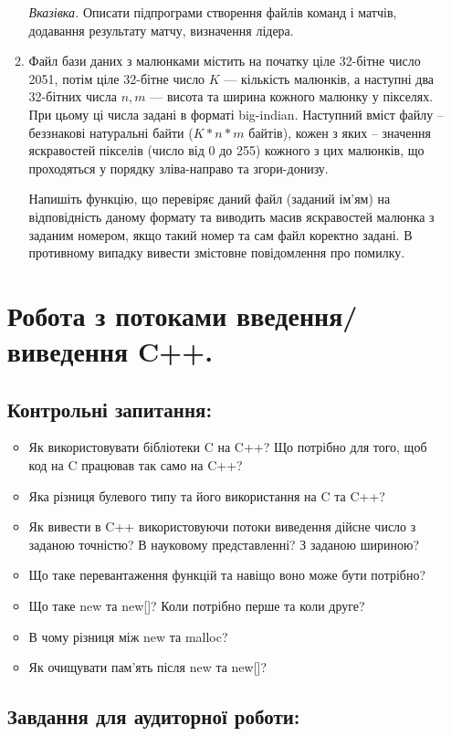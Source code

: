 \documentclass[a5paper,titlepage,openany,twoside,
]
{book_unv}%
\begin{document}
\begin{enumerate}
\begin{enumerate}
\emph{Вказівка.} Описати підпрограми створення файлів команд і матчів, 
додавання результату матчу, визначення лідера.

\item
Файл бази даних з малюнками містить на початку ціле 32-бітне число
2051, потім ціле 32-бітне число $K$ --- кількість малюнків, а наступні два
32-бітних числа $n,m$ --- висота та ширина кожного малюнку у
пікселях. При цьому ці числа задані в форматі big-indian.
Наступний вміст файлу -- беззнакові натуральні байти ($K*n*m$ байтів),
кожен з яких -- значення яскравостей пікселів (число від 0 до 255)
кожного з цих малюнків, що проходяться у порядку зліва-направо та
згори-донизу.

Напишіть функцію, що перевіряє даний файл (заданий ім'ям) на
відповідність даному формату та виводить масив яскравостей малюнка з
заданим номером, якщо такий номер та сам файл коректно задані. В
противному випадку вивести змістовне повідомлення про помилку.

\end{enumerate}


\chapter{Робота з потоками введення/виведення C++.}
%

\section{Контрольні запитання:}
\begin{itemize}

\item
  Як використовувати бібліотеки C на C++? Що потрібно для того, щоб код
  на C працював так само на C++?
\item
  Яка різниця булевого типу та його використання на C та C++?
\item
  Як вивести в C++ використовуючи потоки виведення дійсне число з
  заданою точністю? В науковому представленні? З заданою шириною?
\item
  Що таке перевантаження функцій та навіщо воно може бути потрібно?
\item
  Що таке new та new{[}{]}? Коли потрібно перше та коли друге?
\item
  В чому різниця між new та malloc?
\item
  Як очищувати пам'ять після new та new{[}{]}?
\end{itemize}

\section{Завдання для аудиторної роботи:}


\end{enumerate}
\end{document}
